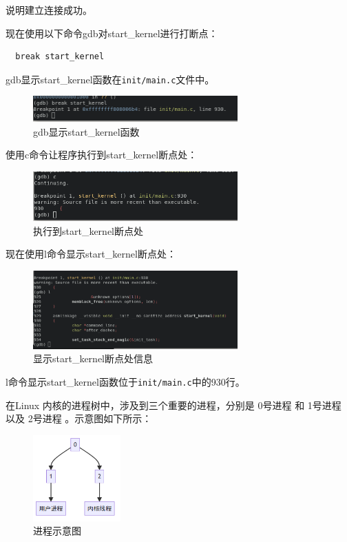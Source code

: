 \documentclass[lang=cn,10pt]{elegantbook}
\begin{document}
说明建立连接成功。

\newpage
现在使用以下命令gdb对start\_kernel进行打断点：

\begin{lstlisting}
  break start_kernel
\end{lstlisting}

gdb显示start\_kernel函数在\lstinline{init/main.c}文件中。

\begin{figure}[htbp]
  \centering
  \includegraphics[width=0.7\textwidth]{image/image-20231105112248991.png}
  \caption{gdb显示start\_kernel函数}
\end{figure}


使用c命令让程序执行到start\_kernel断点处：
\begin{figure}[htbp]
  \centering
  \includegraphics[width=0.7\textwidth]{image/image-20231105112437905.png}
  \caption{执行到start\_kernel断点处}
\end{figure}

现在使用l命令显示start\_kernel断点处：
\begin{figure}[htbp]
  \centering
  \includegraphics[width=0.7\textwidth]{image/image-20231105112512318.png}
  \caption{显示start\_kernel断点处信息}
\end{figure}

l命令显示start\_kernel函数位于\lstinline{init/main.c}中的930行。

在Linux 内核的进程树中，涉及到三个重要的进程，分别是 0号进程 和 1号进程 以及 2号进程 。示意图如下所示：

\begin{figure}[htbp]
  \centering
  \includegraphics[width=0.3\textwidth]{image/jc.png}
  \caption{进程示意图}
\end{figure}
\end{document}
